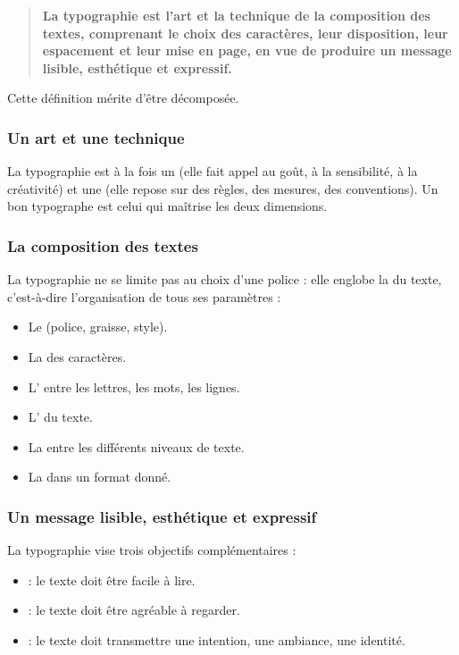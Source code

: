 \begin{quote}
\textbf{La typographie est l'art et la technique de la composition des textes, comprenant le choix des caractères, leur disposition, leur espacement et leur mise en page, en vue de produire un message lisible, esthétique et expressif.}
\end{quote}

Cette définition mérite d'être décomposée.

\subsubsection{Un art et une technique}

La typographie est à la fois un  (elle fait appel au goût, à la sensibilité, à la créativité) et une  (elle repose sur des règles, des mesures, des conventions). Un bon typographe est celui qui maîtrise les deux dimensions.

\subsubsection{La composition des textes}

La typographie ne se limite pas au choix d'une police : elle englobe la  du texte, c'est-à-dire l'organisation de tous ses paramètres :

\begin{itemize}
    \item Le  (police, graisse, style).
    \item La  des caractères.
    \item L' entre les lettres, les mots, les lignes.
    \item L' du texte.
    \item La  entre les différents niveaux de texte.
    \item La  dans un format donné.
\end{itemize}

\subsubsection{Un message lisible, esthétique et expressif}

La typographie vise trois objectifs complémentaires :

\begin{itemize}
    \item {} : le texte doit être facile à lire.
    \item {} : le texte doit être agréable à regarder.
    \item {} : le texte doit transmettre une intention, une ambiance, une identité.
\end{itemize}

